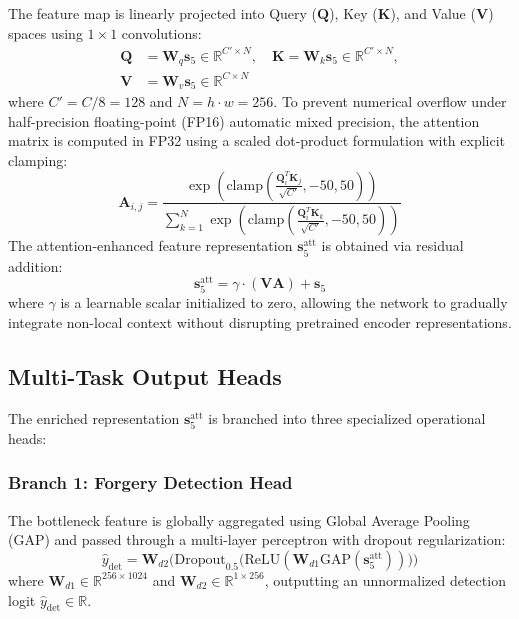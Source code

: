 \documentclass[pdflatex,sn-mathphys-num,iicol]{sn-jnl}
\begin{document}
The feature map is linearly projected into Query ($\mathbf{Q}$), Key ($\mathbf{K}$), and Value ($\mathbf{V}$) spaces using $1 \times 1$ convolutions:
\begin{align}
\mathbf{Q} &= \mathbf{W}_q \mathbf{s}_5 \in \mathbb{R}^{C' \times N}, \quad \mathbf{K} = \mathbf{W}_k \mathbf{s}_5 \in \mathbb{R}^{C' \times N}, \nonumber \\
\mathbf{V} &= \mathbf{W}_v \mathbf{s}_5 \in \mathbb{R}^{C \times N}\label{eq_qkv}
\end{align}
where $C' = C / 8 = 128$ and $N = h \cdot w = 256$. To prevent numerical overflow under half-precision floating-point (FP16) automatic mixed precision, the attention matrix is computed in FP32 using a scaled dot-product formulation with explicit clamping:
\begin{equation}
\mathbf{A}_{i, j} = \frac{\exp\left(\text{clamp}\left(\frac{\mathbf{Q}_i^T \mathbf{K}_j}{\sqrt{C'}}, -50, 50\right)\right)}{\sum_{k=1}^N \exp\left(\text{clamp}\left(\frac{\mathbf{Q}_i^T \mathbf{K}_k}{\sqrt{C'}}, -50, 50\right)\right)}\label{eq_attn_matrix}
\end{equation}
The attention-enhanced feature representation $\mathbf{s}_5^{\text{att}}$ is obtained via residual addition:
\begin{equation}
\mathbf{s}_5^{\text{att}} = \gamma \cdot (\mathbf{V} \mathbf{A}) + \mathbf{s}_5\label{eq_attn_res}
\end{equation}
where $\gamma$ is a learnable scalar initialized to zero, allowing the network to gradually integrate non-local context without disrupting pretrained encoder representations.

\subsection{Multi-Task Output Heads}\label{subsec4_4}
The enriched representation $\mathbf{s}_5^{\text{att}}$ is branched into three specialized operational heads:

\subsubsection{Branch 1: Forgery Detection Head}
The bottleneck feature is globally aggregated using Global Average Pooling (GAP) and passed through a multi-layer perceptron with dropout regularization:
\begin{equation}
\hat{y}_{\text{det}} = \mathbf{W}_{d2} \Big(\text{Dropout}_{0.5}\big(\text{ReLU}(\mathbf{W}_{d1} \text{GAP}(\mathbf{s}_5^{\text{att}}))\big)\Big)\label{eq_det_head}
\end{equation}
where $\mathbf{W}_{d1} \in \mathbb{R}^{256 \times 1024}$ and $\mathbf{W}_{d2} \in \mathbb{R}^{1 \times 256}$, outputting an unnormalized detection logit $\hat{y}_{\text{det}} \in \mathbb{R}$.
\end{document}
